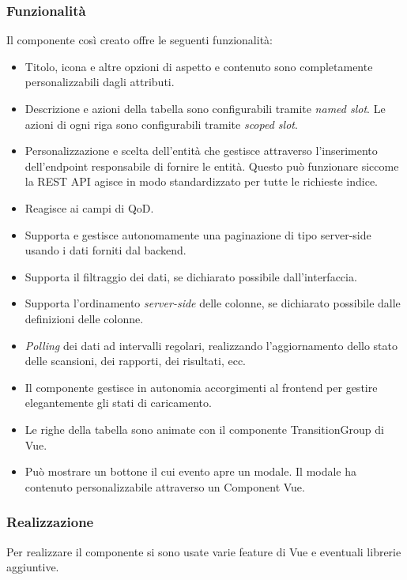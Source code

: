 \subsubsection{Funzionalità}
Il componente così creato offre le seguenti funzionalità:
\begin{itemize}
    \item Titolo, icona e altre opzioni di aspetto e contenuto sono completamente personalizzabili dagli attributi.
    \item Descrizione e azioni della tabella sono configurabili tramite \emph{named slot}. Le azioni di ogni riga sono configurabili tramite \emph{scoped slot}.
    \item Personalizzazione e scelta dell'entità che gestisce attraverso l'inserimento dell'endpoint responsabile di fornire le entità. Questo può funzionare siccome la REST API agisce in modo standardizzato per tutte le richieste indice.
    \item Reagisce ai campi di QoD.
    \item Supporta e gestisce autonomamente una paginazione di tipo server-side usando i dati forniti dal backend.
    \item Supporta il filtraggio dei dati, se dichiarato possibile dall'interfaccia.
    \item Supporta l'ordinamento \emph{server-side} delle colonne, se dichiarato possibile dalle definizioni delle colonne.
    \item \emph{Polling} dei dati ad intervalli regolari, realizzando l'aggiornamento dello stato delle scansioni, dei rapporti, dei risultati, ecc.
    \item Il componente gestisce in autonomia accorgimenti al frontend per gestire elegantemente gli stati di caricamento.
    \item Le righe della tabella sono animate con il componente TransitionGroup di Vue.
    \item Può mostrare un bottone il cui evento apre un modale. Il modale ha contenuto personalizzabile attraverso un Component Vue.
\end{itemize}

\subsubsection{Realizzazione}
Per realizzare il componente si sono usate varie feature di Vue e eventuali librerie aggiuntive.

